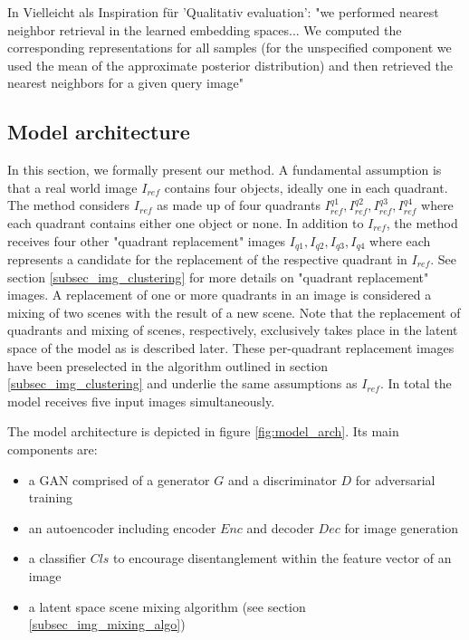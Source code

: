 \documentclass[12pt,a4paper]{article}
\begin{document}
\par In \cite{1611.03383} Vielleicht als Inspiration für 'Qualitativ evaluation': "we performed nearest neighbor retrieval in the learned embedding spaces... We computed the corresponding representations for all samples (for the unspecified component we used the mean of the approximate posterior distribution) and then retrieved the nearest neighbors for a given query image"


\subsection{Model architecture}
In this section, we formally present our method. A fundamental assumption is that a real world image $I_{ref}$ contains four objects, ideally one in each quadrant. The method considers $I_{ref}$ as made up of four quadrants $I^{q1}_{ref}, I^{q2}_{ref}, I^{q3}_{ref}, I^{q4}_{ref}$ where each quadrant contains either one object or none. In addition to $I_{ref}$, the method receives four other "quadrant replacement" images $I_{q1},I_{q2},I_{q3},I_{q4}$ where each represents a candidate for the replacement of the respective quadrant in $I_{ref}$. See section \ref{subsec_img_clustering} for more details on "quadrant replacement" images. A replacement of one or more quadrants in an image is considered a mixing of two scenes with the result of a new scene. Note that the replacement of quadrants and mixing of scenes, respectively, exclusively takes place in the latent space of the model as is described later. These per-quadrant replacement images have been preselected in the algorithm outlined in section \ref{subsec_img_clustering} and underlie the same assumptions as $I_{ref}$. In total the model receives five input images simultaneously.

The model architecture is depicted in figure \ref{fig:model_arch}. Its main components are:

\begin{itemize}
   \item a GAN comprised of a generator $G$ and a discriminator $D$ for adversarial training
   \item an autoencoder including encoder $Enc$ and decoder $Dec$ for image generation
   \item a classifier $Cls$ to encourage disentanglement within the feature vector of an image
   \item a latent space scene mixing algorithm (see section \ref{subsec_img_mixing_algo})
\end{itemize}
 
\end{document}
